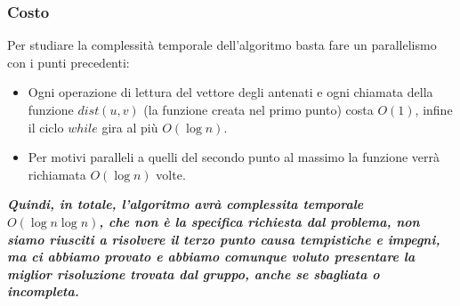 \documentclass{article}
\begin{document}
\subsubsection{Costo}
Per studiare la complessità temporale dell'algoritmo basta fare un parallelismo con i punti precedenti: 
\begin{itemize}
	\item Ogni operazione di lettura del vettore degli antenati e ogni chiamata della funzione $dist(u, v)$ (la funzione creata nel primo punto) costa $O(1)$, infine il ciclo $while$ gira al più $O(\log n)$.
	\item Per motivi paralleli a quelli del secondo punto al massimo la funzione verrà richiamata $O(\log n)$ volte.
\end{itemize}
\textbf{\textit{Quindi, in totale, l'algoritmo avrà complessita temporale $O(\log n \log n)$, che non è la specifica richiesta dal problema, non siamo riusciti a risolvere il terzo punto causa tempistiche e impegni, ma ci abbiamo provato e abbiamo comunque voluto presentare la miglior risoluzione trovata dal gruppo, anche se sbagliata o incompleta.}}
\end{document}
